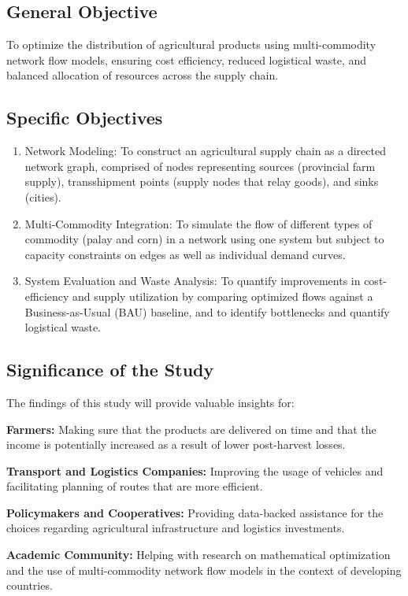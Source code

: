 \documentclass{icsthesis}
\begin{document}
\begin{mainmatter}
\subsection{General Objective}
To optimize the distribution of agricultural products using multi-commodity network flow models, ensuring cost efficiency, reduced logistical waste, and balanced allocation of resources across the supply chain.


\subsection{Specific Objectives}
\begin{enumerate}
\item Network Modeling: To construct an agricultural supply chain as a directed network graph, comprised of nodes representing sources (provincial farm supply), transshipment points (supply nodes that relay goods), and sinks (cities).
\item Multi-Commodity Integration: To simulate the flow of different types of commodity (palay and corn) in a network using one system but subject to capacity constraints on edges as well as individual demand curves.
\item System Evaluation and Waste Analysis: To quantify improvements in cost-efficiency and supply utilization by comparing optimized flows against a Business-as-Usual (BAU) baseline, and to identify bottlenecks and quantify logistical waste.
\end{enumerate}

\subsection{Significance of the Study}
The findings of this study will provide valuable insights for:

\textbf{Farmers:} Making sure that the products are delivered on time and that the income is potentially increased as a result of lower post-harvest losses.

\textbf{Transport and Logistics Companies:} Improving the usage of vehicles and facilitating planning of routes that are more efficient.

\textbf{Policymakers and Cooperatives:} Providing data-backed assistance for the choices regarding agricultural infrastructure and logistics investments.

\textbf{Academic Community:} Helping with research on mathematical optimization and the use of multi-commodity network flow models in the context of developing countries.


\end{mainmatter}
\end{document}
